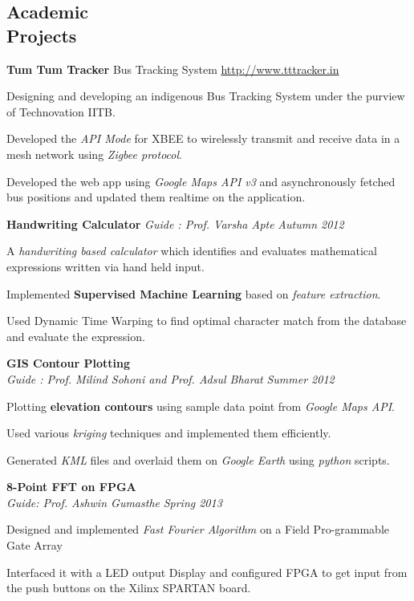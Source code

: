 \documentclass[margin,11pt]{resume}
\begin{document}
\begin{resume}
\section{\mysidestyle Academic\\Projects}

\textbf{Tum Tum Tracker} \hfill Bus Tracking System \hfill
    \url{http://www.tttracker.in}
\begin{list2}
\item Designing and developing an indigenous Bus Tracking System under the purview of Technovation IITB.
\item Developed the \emph{API Mode} for XBEE to wirelessly transmit and receive data in a mesh network using \emph{Zigbee protocol}.
\item Developed the web app using \emph{Google Maps API v3} and asynchronously fetched bus positions and updated them realtime  on the application.
\end{list2}

\textbf{Handwriting Calculator} \hfill
    \textsl{Guide : Prof. Varsha Apte} \hfill \emph{Autumn 2012}
\begin{list2}
\item A\emph{ handwriting based calculator} which identifies and evaluates mathematical expressions written via hand held input.
\item Implemented \textbf{Supervised Machine Learning} based on \emph{feature extraction}. 
\item Used Dynamic Time Warping to find optimal character match from the database and evaluate the expression.
\end{list2}

\textbf{GIS Contour Plotting}\\
  \textsl{Guide : Prof. Milind Sohoni and Prof. Adsul Bharat} \hfill \emph{Summer 2012}
\begin{list2}
\item Plotting \textbf{elevation contours} using sample data point from \emph{Google Maps API}.
\item Used various \emph{kriging} techniques and implemented them efficiently.
\item Generated \emph{KML} files and overlaid them on \emph{Google Earth} using \emph{python} scripts. \\
\end{list2}
\vspace{2mm}
\textbf{8-Point FFT on FPGA}\\ \textsl{Guide: Prof. Ashwin Gumasthe} \hfill \emph{Spring 2013}
\begin{list2}
\item Designed and implemented \emph{Fast Fourier Algorithm} on a Field Pro-grammable Gate Array 
\item Interfaced it with a LED output Display and configured FPGA to get input from the push buttons on the Xilinx SPARTAN board.
\end{list2}


\end{resume}
\end{document}

